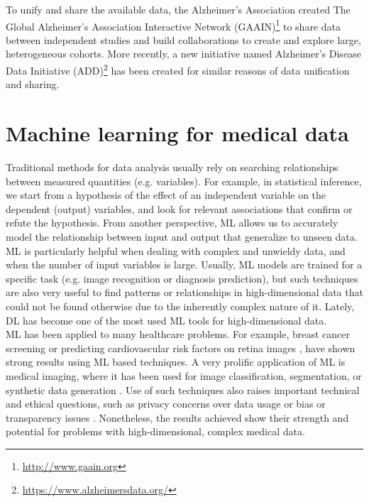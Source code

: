 To unify and share the available data, the Alzheimer's Association created The Global Alzheimer’s Association Interactive Network (GAAIN)\footnote{\url{http://www.gaain.org}} to share data between independent studies and build collaborations to create and explore large, heterogeneous cohorts. More recently, a new initiative named Alzheimer's Disease Data Initiative (ADD)\footnote{\url{https://www.alzheimersdata.org/}} has been created for similar reasons of data unification and sharing. \\

\section{Machine learning for medical data}

Traditional methods for data analysis usually rely on searching relationships between measured quantities (e.g. variables). For example, in statistical inference, we start from a hypothesis of the effect of an independent variable on the dependent (output) variables, and look for relevant associations that confirm or refute the hypothesis. From another perspective, ML allows us to accurately model the relationship between input and output that generalize to unseen data. ML is particularly helpful when dealing with complex and unwieldy data, and when the number of input variables is large. Usually, ML models are trained for a specific task (e.g. image recognition or diagnosis prediction), but such techniques are also very useful to find patterns or relationships in high-dimensional data that could not be found otherwise due to the inherently complex nature of it. Lately, DL has become one of the most used ML tools for high-dimensional data. \\

ML has been applied to many healthcare problems. For example, breast cancer screening \cite{McKinney2020} or predicting cardiovascular risk factors on retina images \cite{Poplin2018}, have shown strong results using ML based techniques. A very prolific application of ML is medical imaging, where it has been used for image classification, segmentation, or synthetic data generation \cite{Litjens2017}. Use of such techniques also raises important technical and ethical questions, such as privacy concerns over data usage \cite{Yang2019} or bias or transparency issues \cite{Karikari2020, Haibe-Kains2020}. Nonetheless, the results achieved show their strength and potential for problems with high-dimensional, complex medical data. \\

